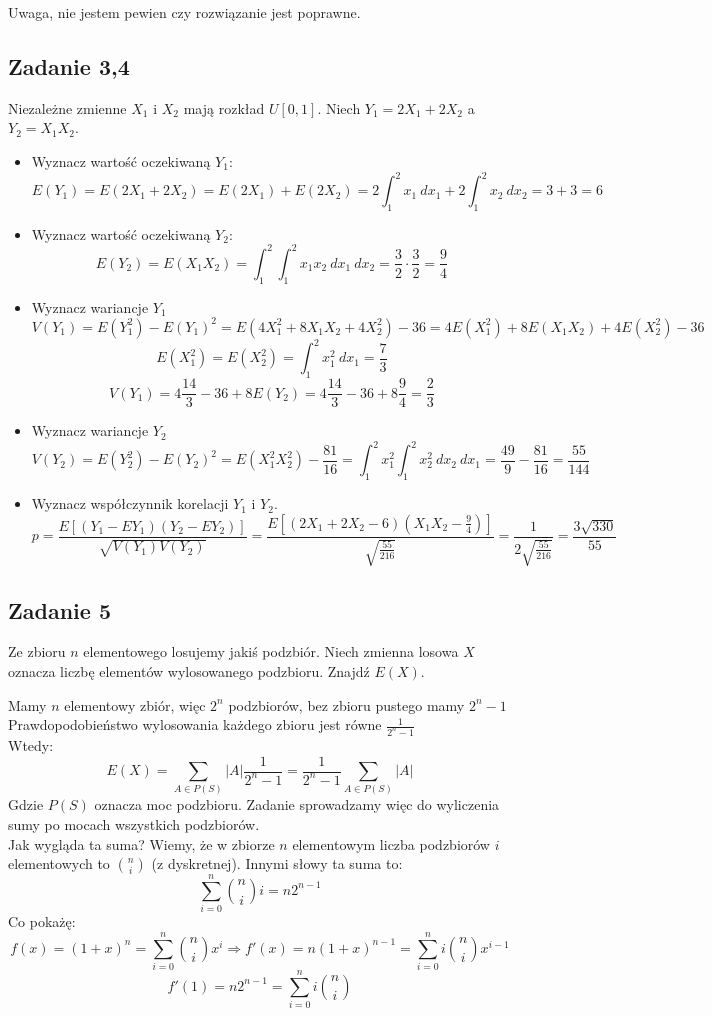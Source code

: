 \documentclass[a4paper]{article}
\begin{document}
Uwaga, nie jestem pewien czy rozwiązanie jest poprawne.

\subsection*{Zadanie 3,4}
Niezależne zmienne $X_1$ i $X_2$ mają rozkład $U[0,1]$. Niech $Y_1=2X_1+2X_2$ a $Y_2=X_1X_2$.
\begin{itemize}
\item Wyznacz wartość oczekiwaną $Y_1$:\\
$$E(Y_1)=E(2X_1+2X_2)=E(2X_1)+E(2X_2)=2\int_1^2 x_1\ dx_1 + 2\int_1^2 x_2\ dx_2 = 3+3=6$$
\item Wyznacz wartość oczekiwaną $Y_2$:\\
$$E(Y_2)=E(X_1X_2)=\int_1^2 \int_1^2 x_1 x_2\ dx_1\ dx_2 = \frac{3}{2}\cdot \frac{3}{2} = \frac{9}{4} $$
\item Wyznacz wariancje $Y_1$
$$V(Y_1)=E(Y_1^2)-E(Y_1)^2 = E(4X_1^2 + 8X_1X_2 + 4X_2^2) - 36 = 4E(X_1^2)+8E(X_1X_2)+4E(X_2^2) - 36$$
$$E(X_1^2)=E(X_2^2)=\int_1^2 x_1^2 \ dx_1 = \frac{7}{3} $$
$$V(Y_1)=4\frac{14}{3}-36+8E(Y_2)=4\frac{14}{3}-36+8\frac{9}{4}=\frac{2}{3}$$
\item Wyznacz wariancje $Y_2$
$$V(Y_2) = E(Y_2^2)-E(Y_2)^2 = E(X_1^2X_2^2)-\frac{81}{16} = \int_1^2 x_1^2 \int_1^2 x_2^2\ dx_2 \ dx_1 = \frac{49}{9}-\frac{81}{16}=\frac{55}{144}$$
\item Wyznacz współczynnik korelacji $Y_1$ i $Y_2$.
$$p=\frac{E[(Y_1 - EY_1)(Y_2 - EY_2)]}{\sqrt{V(Y_1)V(Y_2)}}=\frac{E[(2X_1+2X_2 - 6)(X_1X_2 - \frac{9}{4})]}{\sqrt{\frac{55}{216}}} = \frac{1}{2\sqrt{\frac{55}{216}}}=\frac{3\sqrt{330}}{55}$$

\end{itemize}

\subsection*{Zadanie 5}
Ze zbioru $n$ elementowego losujemy jakiś podzbiór. Niech zmienna losowa $X$ oznacza liczbę elementów wylosowanego podzbioru. Znajdź $E(X)$.

Mamy $n$ elementowy zbiór, więc $2^n$ podzbiorów, bez zbioru pustego mamy $2^{n}-1$\\ 
Prawdopodobieństwo wylosowania każdego zbioru jest równe $\frac{1}{2^n-1}$\\
Wtedy:\\
$$E(X)=\sum_{A\in P(S)}|A| \frac{1}{2^n-1} = \frac{1}{2^n-1}\sum_{A\in P(S)}|A|$$
Gdzie $P(S)$ oznacza moc podzbioru. Zadanie sprowadzamy więc do wyliczenia sumy po mocach wszystkich podzbiorów.\\
Jak wygląda ta suma? Wiemy, że w zbiorze $n$ elementowym liczba podzbiorów $i$ elementowych to ${n \choose i}$ (z dyskretnej). Innymi słowy ta suma to:
$$\sum_{i=0}^n {n \choose i} i = n2^{n-1}$$
Co pokażę:
$$f(x)=(1+x)^n = \sum_{i=0}^n {n \choose i} x^i \Rightarrow f'(x)=n(1+x)^{n-1}=\sum_{i=0}^n i{n \choose i} x^{i-1}$$
$$f'(1)=n2^{n-1}=\sum_{i=0}^n i{n \choose i} $$
\end{document}
